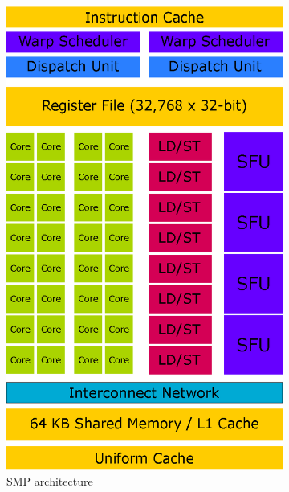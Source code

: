 \begin{figure}[p]
\centering
\begin{subfigure}{0.49\textwidth}
  \centering
  \includegraphics[width=0.8\linewidth]{img/SMPArchitecture.eps}
  \caption{SMP architecture}
  \label{fig:smparchitecture}
\end{subfigure}
\begin{subfigure}{0.49\textwidth}
  \centering

\end{subfigure}
\end{figure}

